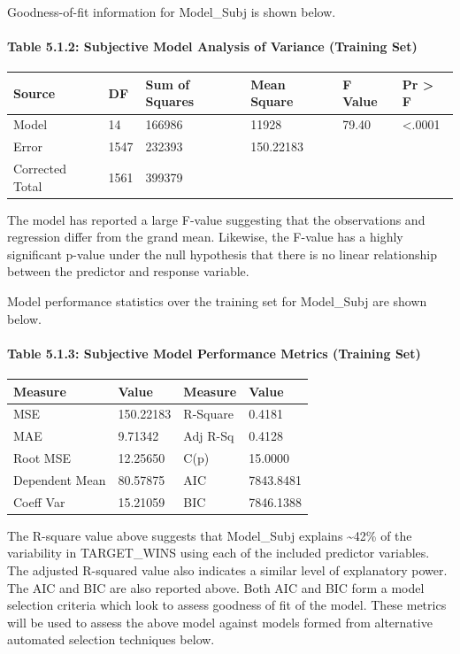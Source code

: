 \documentclass[]{article}
\let\oldparagraph\paragraph
\renewcommand{\paragraph}[1]{\oldparagraph{#1}\mbox{}}
\begin{document}
Goodness-of-fit information for Model\_Subj is shown below.

\paragraph{Table 5.1.2: Subjective Model Analysis of Variance (Training
Set)}\label{table-5.1.2-subjective-model-analysis-of-variance-training-set}

\begin{longtable}[]{@{}llllll@{}}
\toprule
Source & DF & Sum of Squares & Mean Square & F Value & Pr \textgreater{}
F\tabularnewline
\midrule
\endhead
Model & 14 & 166986 & 11928 & 79.40 & \textless{}.0001\tabularnewline
Error & 1547 & 232393 & 150.22183 & &\tabularnewline
Corrected Total & 1561 & 399379 & & &\tabularnewline
\bottomrule
\end{longtable}

The model has reported a large F-value suggesting that the observations
and regression differ from the grand mean. Likewise, the F-value has a
highly significant p-value under the null hypothesis that there is no
linear relationship between the predictor and response variable.

Model performance statistics over the training set for Model\_Subj are
shown below.

\paragraph{Table 5.1.3: Subjective Model Performance Metrics (Training
Set)}\label{table-5.1.3-subjective-model-performance-metrics-training-set}

\begin{longtable}[]{@{}llll@{}}
\toprule
Measure & Value & Measure & Value\tabularnewline
\midrule
\endhead
MSE & 150.22183 & R-Square & 0.4181\tabularnewline
MAE & 9.71342 & Adj R-Sq & 0.4128\tabularnewline
Root MSE & 12.25650 & C(p) & 15.0000\tabularnewline
Dependent Mean & 80.57875 & AIC & 7843.8481\tabularnewline
Coeff Var & 15.21059 & BIC & 7846.1388\tabularnewline
\bottomrule
\end{longtable}

The R-square value above suggests that Model\_Subj explains
\textasciitilde{}42\% of the variability in TARGET\_WINS using each of
the included predictor variables. The adjusted R-squared value also
indicates a similar level of explanatory power. The AIC and BIC are also
reported above. Both AIC and BIC form a model selection criteria which
look to assess goodness of fit of the model. These metrics will be used
to assess the above model against models formed from alternative
automated selection techniques below.
\end{document}
